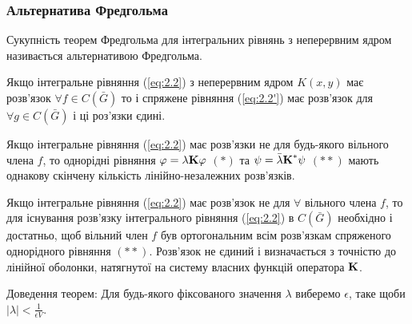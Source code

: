 \subsubsection*{Альтернатива Фредгольма}

Сукупність теорем Фредгольма для інтегральних рівнянь з неперервним ядром називається альтернативою Фредгольма.

\begin{theorem}
	Якщо інтегральне рівняння (\ref{eq:2.2}) з неперервним ядром $K(x, y)$ має розв'язок $\forall f \in C(\bar G)$ то і спряжене рівняння (\ref{eq:2.2'}) має розв'язок для $\forall g \in C(\bar G)$ і ці роз'язки єдині.
\end{theorem}
\begin{theorem}
	Якщо інтегральне рівняння (\ref{eq:2.2}) має розв'язки не для будь-якого вільного члена $f$, то однорідні рівняння $\phi = \lambda \bf{K} \phi$ $(*)$ та $\psi = \bar \lambda \bf{K}^* \psi$ $(**)$ мають однакову скінчену кількість лінійно-незалежних розв'язків.
\end{theorem}
\begin{theorem}
	Якщо інтегральне рівняння (\ref{eq:2.2}) має розв'язок не для $\forall$ вільного члена $f$, то для існування розв'язку інтегрального рівняння (\ref{eq:2.2}) в $C(\bar G)$ необхідно і достатньо, щоб вільний член $f$ був ортогональним всім розв'язкам спряженого однорідного рівняння $(**)$. Розв'язок не єдиний і визначається з точністю до лінійної оболонки, натягнутої на систему власних функцій оператора $\bf{K}$.
\end{theorem}

Доведення теорем: Для будь-якого фіксованого значення $\lambda$ виберемо $\epsilon$, таке щоби $|\lambda| < \frac{1}{\epsilon V}$.


